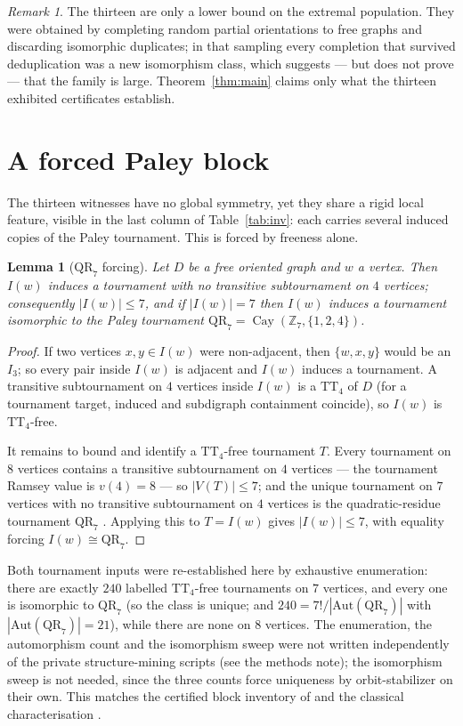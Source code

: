 \documentclass[11pt]{amsart}
\newcommand{\TT}[1]{\mathrm{TT}_{#1}}
\newcommand{\I}[1]{I_{#1}}
\newcommand{\QR}{\mathrm{QR}_7}
\newcommand{\Aut}{\mathrm{Aut}}
\DeclareMathOperator{\Cay}{Cay}
\theoremstyle{plain}
\newtheorem{lemma}[theorem]{Lemma}
\theoremstyle{definition}
\theoremstyle{remark}
\newtheorem{remark}[theorem]{Remark}
\begin{document}
\begin{remark}
The thirteen are only a lower bound on the extremal population. They were
obtained by completing random partial orientations to free graphs and
discarding isomorphic duplicates; in that sampling every completion that
survived deduplication was a new isomorphism class, which suggests --- but
does not prove --- that the family is large. Theorem~\ref{thm:main}
claims only what the thirteen exhibited certificates establish.
\end{remark}

\section{A forced Paley block}\label{sec:qr7}

The thirteen witnesses have no global symmetry, yet they share a rigid
local feature, visible in the last column of Table~\ref{tab:inv}: each
carries several induced copies of the Paley tournament. This is forced by
freeness alone.

\begin{lemma}[$\QR$ forcing]\label{lem:forcing}
Let $D$ be a free oriented graph and $w$ a vertex. Then $I(w)$ induces a
tournament with no transitive subtournament on $4$ vertices; consequently
$|I(w)|\le 7$, and if $|I(w)|=7$ then $I(w)$ induces a tournament
isomorphic to the Paley tournament $\QR=\Cay(\mathbb{Z}_7,\{1,2,4\})$.
\end{lemma}

\begin{proof}
If two vertices $x,y\in I(w)$ were non-adjacent, then $\{w,x,y\}$ would be
an $\I{3}$; so every pair inside $I(w)$ is adjacent and $I(w)$ induces a
tournament. A transitive subtournament on $4$ vertices inside $I(w)$ is a
$\TT{4}$ of $D$ (for a tournament target, induced and subdigraph
containment coincide), so $I(w)$ is $\TT{4}$-free.

It remains to bound and identify a $\TT{4}$-free tournament $T$. Every
tournament on $8$ vertices contains a transitive subtournament on $4$
vertices --- the tournament Ramsey value is $v(4)=8$ --- so $|V(T)|\le 7$;
and the unique tournament on $7$ vertices with no transitive
subtournament on $4$ vertices is the quadratic-residue tournament $\QR$
\cite{SanchezFlores98,ErdosMoser64}. Applying this to $T=I(w)$ gives
$|I(w)|\le 7$, with equality forcing $I(w)\cong\QR$.
\end{proof}

Both tournament inputs were re-established here by exhaustive
enumeration: there are exactly $240$ labelled $\TT{4}$-free
tournaments on $7$ vertices, and every one is isomorphic to $\QR$ (so the
class is unique; and $240=7!/|\Aut(\QR)|$ with $|\Aut(\QR)|=21$), while
there are none on $8$ vertices. The enumeration, the automorphism count
and the isomorphism sweep were not written independently of the private
structure-mining scripts (see the methods note); the isomorphism sweep is
not needed, since the three counts force uniqueness by orbit-stabilizer on
their own. This matches the certified block
inventory of \cite[Prop.~3.3]{PartG} and the classical characterisation
\cite{SanchezFlores98}.
\end{document}
